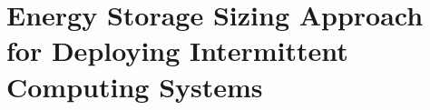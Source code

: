 \chapter{Energy Storage Sizing Approach for Deploying Intermittent Computing Systems}
\label{Chapter:sizingapproach}






